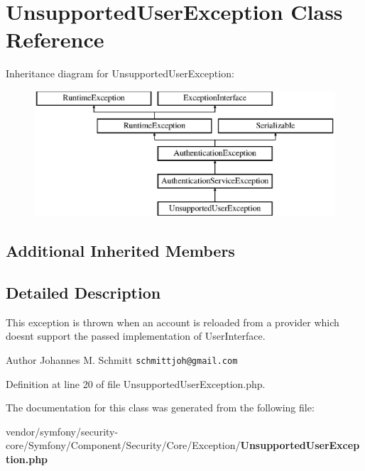 \section{Unsupported\+User\+Exception Class Reference}
\label{class_symfony_1_1_component_1_1_security_1_1_core_1_1_exception_1_1_unsupported_user_exception}
Inheritance diagram for Unsupported\+User\+Exception\+:\begin{figure}[H]
\begin{center}
\leavevmode
\includegraphics[height=4.690117cm]{class_symfony_1_1_component_1_1_security_1_1_core_1_1_exception_1_1_unsupported_user_exception}
\end{center}
\end{figure}
\subsection*{Additional Inherited Members}


\subsection{Detailed Description}
This exception is thrown when an account is reloaded from a provider which doesn\textquotesingle{}t support the passed implementation of User\+Interface.

\begin{DoxyAuthor}{Author}
Johannes M. Schmitt {\tt schmittjoh@gmail.\+com} 
\end{DoxyAuthor}


Definition at line 20 of file Unsupported\+User\+Exception.\+php.



The documentation for this class was generated from the following file\+:\begin{DoxyCompactItemize}
\item 
vendor/symfony/security-\/core/\+Symfony/\+Component/\+Security/\+Core/\+Exception/{\bf Unsupported\+User\+Exception.\+php}\end{DoxyCompactItemize}
